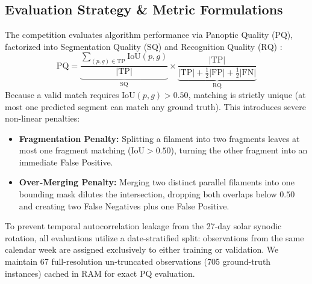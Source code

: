\documentclass[sigconf]{acmart}
\begin{document}
\subsection{Evaluation Strategy \& Metric Formulations}
The competition evaluates algorithm performance via Panoptic Quality ($\text{PQ}$), factorized into Segmentation Quality ($\text{SQ}$) and Recognition Quality ($\text{RQ}$) \cite{kirillov2019panoptic}:
\begin{equation}
    \text{PQ} = \underbrace{\frac{\sum_{(p, g) \in \text{TP}} \text{IoU}(p, g)}{|\text{TP}|}}_{\text{SQ}} \times \underbrace{\frac{|\text{TP}|}{|\text{TP}| + \frac{1}{2}|\text{FP}| + \frac{1}{2}|\text{FN}|}}_{\text{RQ}}
\end{equation}
Because a valid match requires $\text{IoU}(p, g) > 0.50$, matching is strictly unique (at most one predicted segment can match any ground truth). This introduces severe non-linear penalties:
\begin{itemize}
    \item \textbf{Fragmentation Penalty:} Splitting a filament into two fragments leaves at most one fragment matching ($\text{IoU} > 0.50$), turning the other fragment into an immediate False Positive.
    \item \textbf{Over-Merging Penalty:} Merging two distinct parallel filaments into one bounding mask dilutes the intersection, dropping both overlaps below $0.50$ and creating two False Negatives plus one False Positive.
\end{itemize}

To prevent temporal autocorrelation leakage from the 27-day solar synodic rotation, all evaluations utilize a date-stratified split: observations from the same calendar week are assigned exclusively to either training or validation. We maintain 67 full-resolution un-truncated observations (705 ground-truth instances) cached in RAM for exact PQ evaluation.
\end{document}
